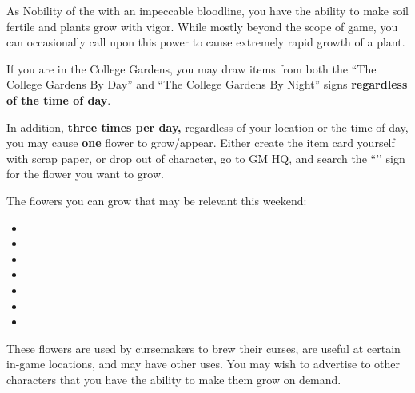 \documentclass[green]{GL2020}
\begin{document}
\name{\gFlowerPower{}}

As Nobility of the \pFarm{} with an impeccable bloodline, you have the ability to make soil fertile and plants grow with vigor. While mostly beyond the scope of game, you can occasionally call upon this power to cause extremely rapid growth of a plant. 

If you are in the College Gardens, you may draw items from both the ``The College Gardens By Day'' and ``The College Gardens By Night'' signs \textbf{regardless of the time of day}.

In addition, \textbf{three times per day,} regardless of your location or the time of day, you may cause \textbf{one} flower to grow/appear. Either create the item card yourself with scrap paper, or drop out of character, go to GM HQ, and search the ``\sFlowerPower{}’’ sign for the flower you want to grow.

The flowers you can grow that may be relevant this weekend:
\begin{itemize}
	\item \iBlackCrocus{}
	\item \iFlameOrchid{}
	\item \iHollyhock{}
	\item \iLily{}
	\item \iMoonflower{}
	\item \iNightshade{}
	\item \iMorningGlory{}
\end{itemize}

These flowers are used by cursemakers to brew their curses, are useful at certain in-game locations, and may have other uses. You may wish to advertise to other characters that you have the ability to make them grow on demand.
\end{document}
